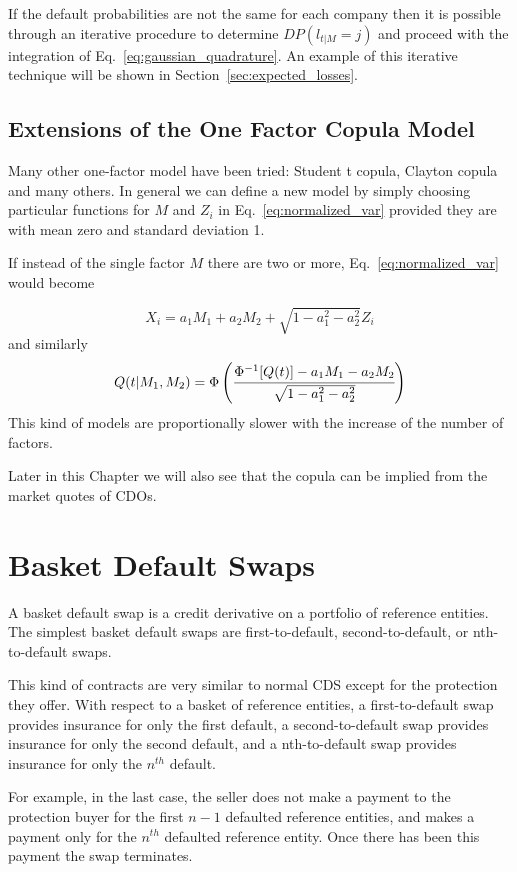 If the default probabilities are not the same for each company then it is possible through an iterative procedure to determine $DP(l_{t|M}=j)$ and proceed with the integration of Eq.~\ref{eq:gaussian_quadrature}.
An example of this iterative technique will be shown in Section~\ref{sec:expected_losses}.

\subsection{Extensions of the One Factor Copula Model}
Many other one-factor model have been tried: Student t copula, Clayton copula and many others. In general we can define a new model by simply choosing particular functions for $M$ and $Z_i$ in Eq.~\ref{eq:normalized_var} provided they are with mean zero and standard deviation 1. 

If instead of the single factor $M$ there are two or more, Eq.~\ref{eq:normalized_var} would become

\[
X_i = a_1 M_1 + a_2 M_2 + \sqrt{1 - a_1^2 - a^2_2}Z_i
\]
and similarly
\[
Q(t|M_1, M_2) = \Phi\left(\cfrac{\Phi^{-1}[Q(t)]-a_1 M_1 - a_2 M_2}{\sqrt{1 - a_1^2 - a^2_2}}\right)
\]
This kind of models are proportionally slower with the increase of the number of factors.

Later in this Chapter we will also see that the copula can be implied from the market quotes of CDOs.

\section{Basket Default Swaps}\label{basket-default-swaps}

A basket default swap is a credit derivative on a portfolio of reference
entities. The simplest basket default swaps are first-to-default,
second-to-default, or nth-to-default swaps. 

This kind of contracts are very similar to normal CDS except for the protection they offer.
With respect to a basket of reference entities, a first-to-default swap provides insurance for only the first default, a second-to-default swap provides insurance
for only the second default, and a nth-to-default swap provides insurance for only the $n^{th}$ default. 

For example, in the last case, the
seller does not make a payment to the protection buyer for
the first $n-1$ defaulted reference entities, and makes a payment only for the
$n^{th}$ defaulted reference entity. Once there has been this payment the swap terminates.

